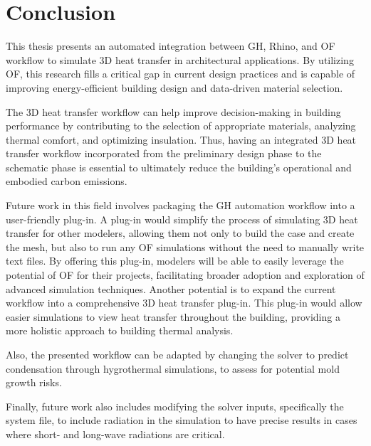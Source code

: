 \chapter{Conclusion}
This thesis presents an automated integration between  \gls{GH}, Rhino, and \gls{OF} workflow to simulate 3D heat transfer in architectural applications. 
By utilizing OF, this research fills a critical gap in current design practices and is capable of improving energy-efficient building design and data-driven material selection. 

The 3D heat transfer workflow can help improve decision-making in building performance by contributing to the selection of appropriate materials, analyzing thermal comfort, and optimizing insulation.
Thus, having an integrated 3D heat transfer workflow incorporated from the preliminary design phase to the schematic phase is essential to ultimately reduce the building's operational and embodied carbon emissions. 

Future work in this field involves packaging the \gls{GH} automation workflow into a user-friendly plug-in. 
A plug-in would simplify the process of simulating 3D heat transfer for other modelers, allowing them not only to build the case and create the mesh, but also to run any \gls{OF} simulations without the need to manually write text files. 
By offering this plug-in, modelers will be able to easily leverage the potential of \gls{OF} for their projects, facilitating broader adoption and exploration of advanced simulation techniques. 
Another potential is to expand the current workflow into a comprehensive 3D heat transfer plug-in. 
This plug-in would allow easier simulations to view heat transfer throughout the building, providing a more holistic approach to building thermal analysis. 

 Also, the presented workflow can be adapted by changing the solver to predict condensation through hygrothermal simulations, to assess for potential mold growth risks.

Finally, future work also includes modifying the solver inputs, specifically the system file, to include radiation in the simulation to have precise results in cases where short- and long-wave radiations are critical. 







